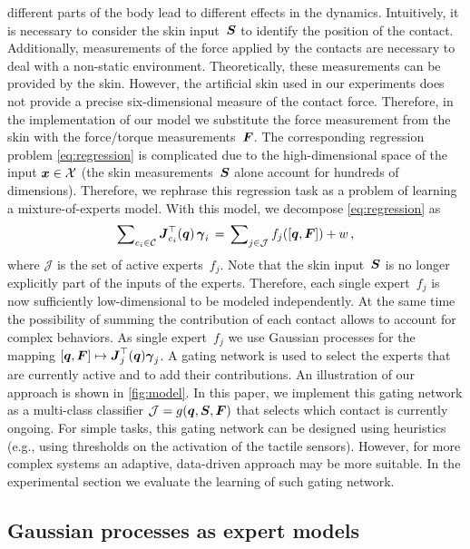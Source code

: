 different parts of the body lead to different effects in the dynamics.
Intuitively, it is necessary to consider the skin input~$\mathcal{\boldsymbol{S}}$ to identify
the position of the contact. Additionally, measurements of the force applied by
the contacts are necessary to deal with a non-static environment. Theoretically,
these measurements can be provided by the skin. However, the artificial skin
used in our experiments does not provide a precise six-dimensional measure of
the contact force. Therefore, in the implementation of our model we substitute
the force measurement from the skin with the force/torque
measurements~$\boldsymbol{F}$. The corresponding regression problem
\eq\eqref{eq:regression} is complicated due to the high-dimensional space of the
input $\boldsymbol x \in \mathcal{X}$ (the skin measurements~$\mathcal{\boldsymbol{S}}$ alone
account for hundreds of dimensions). Therefore, we rephrase this regression task
as a problem of learning a mixture-of-experts model. With this model, we
decompose \eq\eqref{eq:regression} as
\begin{align}
	\sum\nolimits_{c_i \in\mathcal{C}} {\boldsymbol J^\top_{c_i}(\boldsymbol q)}\, \boldsymbol{\gamma}_i \,=\, \sum\nolimits_{j\in\mathcal{J}} f_j([\boldsymbol q, \boldsymbol{F}]) + w\,,
	\label{eq:expertofmixtureregression}
\end{align}  
where $\mathcal{J}$ is the set of active experts~$f_j$. Note that the skin
input~$\mathcal{\boldsymbol{S}}$ is no longer explicitly part of the inputs of the experts.
Therefore, each single expert~$f_j$ is now sufficiently low-dimensional to be
modeled independently. At the same time the possibility of summing the
contribution of each contact allows to account for complex behaviors. As single
expert~$f_j$ we use Gaussian processes for the mapping $[\boldsymbol q, \boldsymbol{F}] \mapsto
{\boldsymbol J^\top_j(\boldsymbol q)} \boldsymbol{\gamma}_j$. A gating network is used to select the
experts that are currently active and to add their contributions.    An
illustration of our approach is shown in \fig\ref{fig:model}. In this paper, we
implement this gating network as a multi-class classifier $\mathcal{J} = g(\boldsymbol q,
\mathcal{\boldsymbol{S}},\boldsymbol{F})$ that selects which contact is currently ongoing. For
simple tasks, this gating network can be designed using heuristics (e.g., using
thresholds on the activation of the tactile sensors). However, for more complex
systems an adaptive, data-driven approach may be more suitable. In the
experimental section we evaluate the learning of such gating network.

\subsection{Gaussian processes as expert models}

